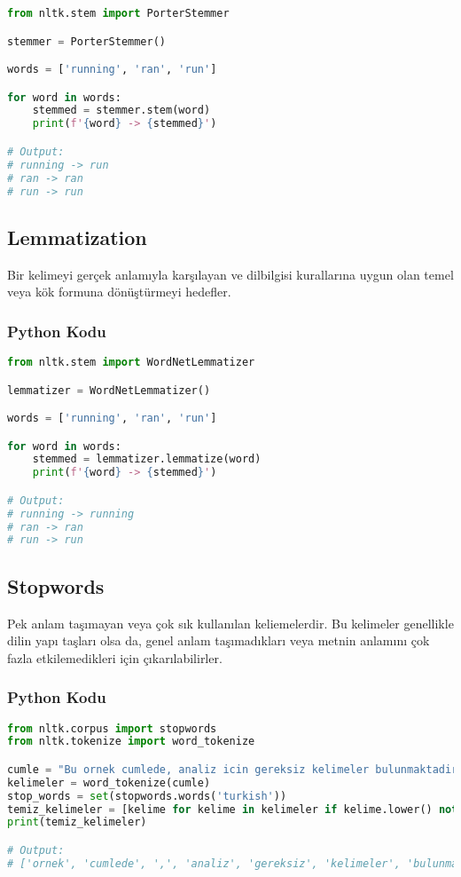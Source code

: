 \begin{lstlisting}[language=Python]
from nltk.stem import PorterStemmer

stemmer = PorterStemmer()

words = ['running', 'ran', 'run']

for word in words:
	stemmed = stemmer.stem(word)
	print(f'{word} -> {stemmed}')

# Output:
# running -> run
# ran -> ran
# run -> run
\end{lstlisting}

\newpage

\subsection{Lemmatization}
Bir kelimeyi gerçek anlamıyla karşılayan ve dilbilgisi kurallarına uygun olan temel veya kök formuna dönüştürmeyi hedefler.

\subsubsection{Python Kodu}

\begin{lstlisting}[language=Python]
from nltk.stem import WordNetLemmatizer

lemmatizer = WordNetLemmatizer()

words = ['running', 'ran', 'run']

for word in words:
	stemmed = lemmatizer.lemmatize(word)
	print(f'{word} -> {stemmed}')

# Output:
# running -> running
# ran -> ran
# run -> run
\end{lstlisting}

\newpage

\subsection{Stopwords}
Pek anlam taşımayan veya çok sık kullanılan keliemelerdir. Bu kelimeler genellikle dilin yapı taşları olsa da, genel anlam taşımadıkları veya metnin anlamını çok fazla etkilemedikleri için çıkarılabilirler.

\subsubsection{Python Kodu}

\begin{lstlisting}[language=Python]
from nltk.corpus import stopwords
from nltk.tokenize import word_tokenize

cumle = "Bu ornek cumlede, analiz icin gereksiz kelimeler bulunmaktadir."
kelimeler = word_tokenize(cumle)
stop_words = set(stopwords.words('turkish'))
temiz_kelimeler = [kelime for kelime in kelimeler if kelime.lower() not in stop_words]
print(temiz_kelimeler)

# Output:
# ['ornek', 'cumlede', ',', 'analiz', 'gereksiz', 'kelimeler', 'bulunmaktadir', '.']
\end{lstlisting}

